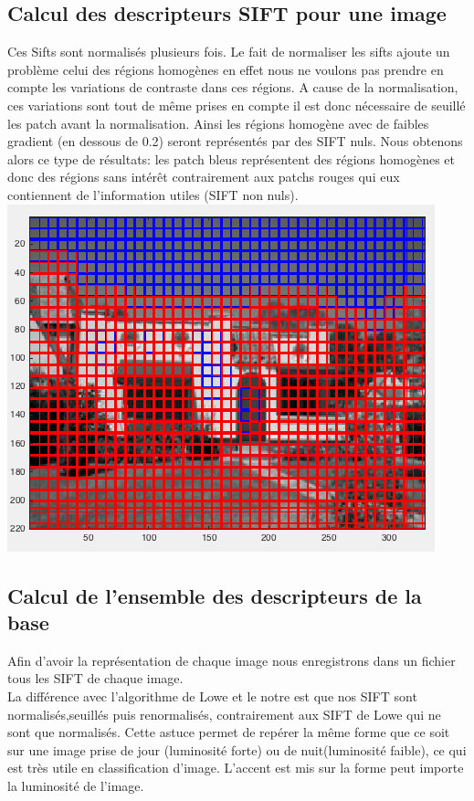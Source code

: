 \documentclass[a4paper]{article}
\begin{document}
\subsection{Calcul des descripteurs SIFT pour une image}
Ces Sifts sont normalisés plusieurs fois. Le fait de normaliser les sifts ajoute un problème celui des régions homogènes en effet nous ne voulons pas prendre en compte les variations de contraste dans ces régions. A cause de la normalisation, ces variations sont tout de même prises en compte il est donc nécessaire de seuillé les patch avant la normalisation. Ainsi les régions homogène avec de faibles gradient (en dessous de 0.2) seront représentés par des SIFT nuls. Nous obtenons alors ce type de résultats: les patch bleus représentent des régions homogènes et donc des régions sans intérêt contrairement aux patchs rouges qui eux contiennent de l'information utiles (SIFT non nuls).\\
\includegraphics[width=\textwidth]{versionrougebleu}\\

\subsection{Calcul de l’ensemble des descripteurs de la base}
Afin d'avoir la représentation de chaque image nous enregistrons dans un fichier tous les SIFT de chaque image. \\
La différence avec l'algorithme de Lowe et le notre est que nos SIFT sont normalisés,seuillés puis renormalisés, contrairement aux SIFT de Lowe qui ne sont que normalisés. Cette astuce permet de repérer la même forme que ce soit sur une image prise de jour (luminosité forte) ou de nuit(luminosité faible), ce qui est très utile en classification d'image. L'accent est mis sur la forme peut importe la luminosité de l'image.
\end{document}
